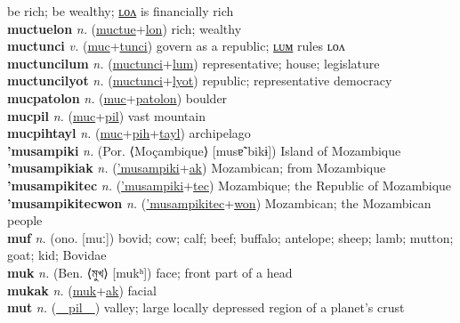 be rich; be wealthy; \hyperref[muctuelon]{ʟᴏᴧ} is financially rich \label{muctue} \\
\textbf{muctuelon} \textit{n.} (\hyperref[muctue]{muctue}+\hyperref[lon]{lon})
rich; wealthy \label{muctuelon} \\
\textbf{muctunci} \textit{v.} (\hyperref[muc]{muc}+\hyperref[tunci]{tunci})
govern as a republic; \hyperref[muctuncilum]{ʟᴜᴍ} rules ʟᴏᴧ \label{muctunci} \\
\textbf{muctuncilum} \textit{n.} (\hyperref[muctunci]{muctunci}+\hyperref[lum]{lum})
representative; house; legislature \label{muctuncilum} \\
\textbf{muctuncilyot} \textit{n.} (\hyperref[muctunci]{muctunci}+\hyperref[lyot]{lyot})
republic; representative democracy \label{muctuncilyot} \\
\textbf{mucpatolon} \textit{n.} (\hyperref[muc]{muc}+\hyperref[patolon]{patolon})
boulder \label{mucpatolon} \\
\textbf{mucpil} \textit{n.} (\hyperref[muc]{muc}+\hyperref[pil]{pil})
vast mountain \label{mucpil} \\
\textbf{mucpihtayl} \textit{n.} (\hyperref[muc]{muc}+\hyperref[pih]{pih}+\hyperref[tayl]{tayl})
archipelago \label{mucpihtayl} \\
\textbf{'musampiki} \textit{n.} (Por. ⟨Moçambique⟩ [musɐ̃ˈbikɨ])
Island of Mozambique \label{'musampiki} \\
\textbf{'musampikiak} \textit{n.} (\hyperref['musampiki]{'musampiki}+\hyperref[ak]{ak})
Mozambican; from Mozambique \label{'musampikiak} \\
\textbf{'musampikitec} \textit{n.} (\hyperref['musampiki]{'musampiki}+\hyperref[tec]{tec})
Mozambique; the Republic of Mozambique \label{'musampikitec} \\
\textbf{'musampikitecwon} \textit{n.} (\hyperref['musampikitec]{'musampikitec}+\hyperref[won]{won})
Mozambican; the Mozambican people \label{'musampikitecwon} \\
\textbf{muf} \textit{n.} (ono. [muː])
bovid; cow; calf; beef; buffalo; antelope; sheep; lamb; mutton; goat; kid; Bovidae \label{muf} \\
\textbf{muk} \textit{n.} (Ben. ⟨মুখ⟩ [mukʰ])
face; front part of a head \label{muk} \\
\textbf{mukak} \textit{n.} (\hyperref[muk]{muk}+\hyperref[ak]{ak})
facial \label{mukak} \\
\textbf{mut} \textit{n.} (\hyperref[pil]{~~pil~~})
valley; large locally depressed region of a planet’s crust \label{mut} \\
